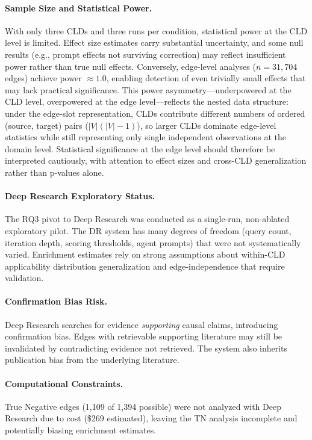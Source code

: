 \paragraph{Sample Size and Statistical Power.}
With only three CLDs and three runs per condition, statistical power at the CLD level is limited. Effect size estimates carry substantial uncertainty, and some null results (e.g., prompt effects not surviving correction) may reflect insufficient power rather than true null effects. Conversely, edge-level analyses ($n = 31{,}704$ edges) achieve power $\approx 1.0$, enabling detection of even trivially small effects that may lack practical significance. This power asymmetry---underpowered at the CLD level, overpowered at the edge level---reflects the nested data structure: under the edge-slot representation, CLDs contribute different numbers of ordered (source, target) pairs ($|V|(|V|-1)$), so larger CLDs dominate edge-level statistics while still representing only single independent observations at the domain level. Statistical significance at the edge level should therefore be interpreted cautiously, with attention to effect sizes and cross-CLD generalization rather than p-values alone.

\paragraph{Deep Research Exploratory Status.}
The RQ3 pivot to Deep Research was conducted as a single-run, non-ablated exploratory pilot. The DR system has many degrees of freedom (query count, iteration depth, scoring thresholds, agent prompts) that were not systematically varied. Enrichment estimates rely on strong assumptions about within-CLD applicability distribution generalization and edge-independence that require validation.

\paragraph{Confirmation Bias Risk.}
Deep Research searches for evidence \textit{supporting} causal claims, introducing confirmation bias. Edges with retrievable supporting literature may still be invalidated by contradicting evidence not retrieved. The system also inherits publication bias from the underlying literature.

\paragraph{Computational Constraints.}
True Negative edges (1,109 of 1,394 possible) were not analyzed with Deep Research due to cost (\$269 estimated), leaving the TN analysis incomplete and potentially biasing enrichment estimates.


